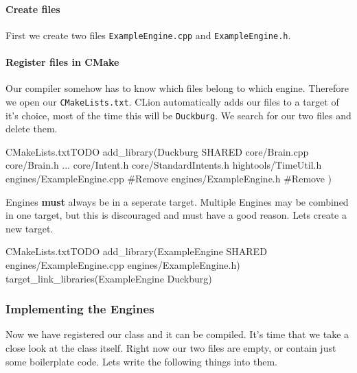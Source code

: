 \documentclass[12pt,a4paper]{article}
\begin{document}
\paragraph{Create files}
First we create two files \texttt{ExampleEngine.cpp} and
\texttt{ExampleEngine.h}.
\paragraph{Register files in CMake}
Our compiler somehow has to know which files belong to which engine.
Therefore we open our \texttt{CMakeLists.txt}.
CLion automatically adds our files to a target of it's choice,
most of the time this will be \texttt{Duckburg}.
We search for our two files and delete them.
\begin{duckcmake}{CMakeLists.txt}{TODO}
add_library(Duckburg SHARED
    core/Brain.cpp
    core/Brain.h
    ...
    core/Intent.h
    core/StandardIntents.h
    hightools/TimeUtil.h
    engines/ExampleEngine.cpp #Remove
    engines/ExampleEngine.h #Remove
    )
\end{duckcmake}
Engines \textbf{must} always be in a seperate target.
Multiple Engines may be combined in one target, but this is
discouraged and must have a good reason.
Lets create a new target.
\begin{duckcmake}{CMakeLists.txt}{TODO}
add_library(ExampleEngine SHARED
    engines/ExampleEngine.cpp 
    engines/ExampleEngine.h)
target_link_libraries(ExampleEngine Duckburg)
\end{duckcmake}
\subsubsection{Implementing the Engines}
Now we have registered our class and it can be compiled.
It's time that we take a close look at the class itself.
Right now our two files are empty, or contain just some boilerplate code.
Lets write the following things into them.
\end{document}
